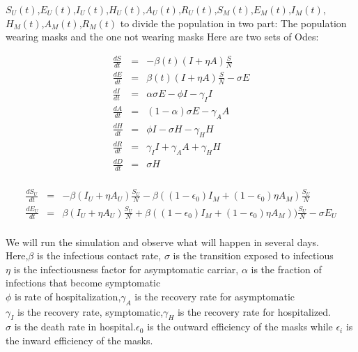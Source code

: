 \documentclass{article}
\begin{document}
$S_{U}(t)$,$E_{U}(t)$,$I_{U}(t)$,$H_{U}(t)$,$A_{U}(t)$,$R_{U}(t)$,$S_{M}(t)$,$E_{M}(t)$,$I_{M}(t)$,$H_{M}(t)$,$A_{M}(t)$,$R_{M}(t)$ to divide the population in two part: The population wearing masks and the one not wearing masks
Here are two sets of Odes:\\
\begin{minipage}{0.45\textwidth}
\begin{eqnarray}
  \frac{dS}{dt} &=& -\beta{(t)}(I+\eta A)\frac{S}{N}\nonumber\\
  \frac{dE}{dt} &=& \beta(t)(I+\eta A)\frac{S}{N}-\sigma{E}\nonumber\\
  \frac{dI}{dt} &=& \alpha\sigma{E}-\phi{I}-\gamma_{I}I\nonumber\\
  \frac{dA}{dt} &=& (1-\alpha)\sigma E-\gamma_{A}A\nonumber\\
  \frac{dH}{dt} &=& \phi I - \sigma H - \gamma_{H}H\nonumber\\
  \frac{dR}{dt} &=& \gamma_{I}{I} + \gamma_{A}{A}+\gamma_{H}{H}\nonumber\\
  \frac{dD}{dt} &=& \sigma H\nonumber\\
\end{eqnarray}
\end{minipage}
\begin{minipage}{0.35\textwidth}
\small
\begin{eqnarray}
  \frac{dS_{U}}{dt} &=& -\beta(I_{U}+\eta A_{U})\frac{S_{U}}{N}-\beta((1-\epsilon_{0})I_{M}+(1-\epsilon_{0})\eta A_{M})\frac{S_{U}}{N}\nonumber\\
  \frac{dE_{U}}{dt} &=& \beta(I_{U}+\eta{A}_{U})\frac{S_{U}}{N}+\beta((1-\epsilon_{0})I_{M}+(1-\epsilon_{0})\eta A_{M}))\frac{S_{U}}{N}-\sigma E_{U}\nonumber\\
  \end{eqnarray}
\end{minipage}

We will run the simulation and observe what will happen in several days. \\Here,$\beta$ is the infectious contact rate, $\sigma$ is the transition exposed to infectious\\$\eta$ is the infectiousness factor for asymptomatic carriar, $\alpha$ is the fraction of infections that become symptomatic\\
$\phi$ is rate of hospitalization,$\gamma_{A}$ is the recovery rate for asymptomatic
\\$\gamma_{I}$ is the recovery rate, symptomatic,$\gamma_{H}$ is the recovery rate for hospitalized.\\$\sigma$ is the death rate in hospital.$\epsilon_{0}$ is the outward efficiency of the masks while $\epsilon_{i}$ is the inward efficiency of the masks.\\
\end{document}
